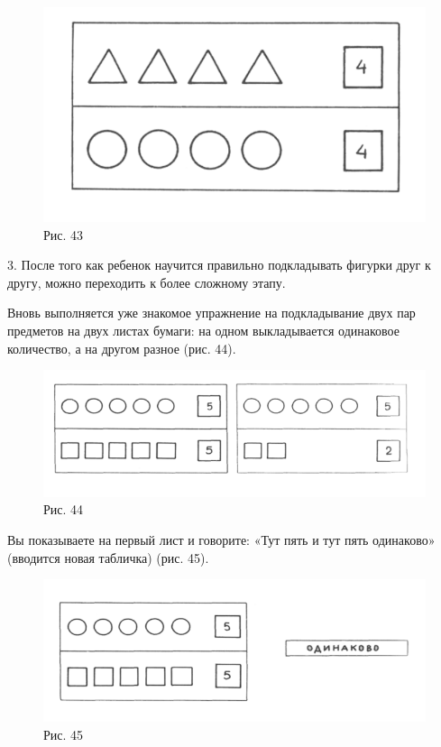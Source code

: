 \documentclass[a5paper]{book}
\begin{document}
\begin{figure}
\centering
\includegraphics[width=\linewidth]{media/media/image39.png}
\caption*{Рис. 43}
\end{figure}

3. После того как ребенок научится правильно подкладывать фигурки друг к
другу, можно переходить к более сложному этапу.

Вновь выполняется уже знакомое упражнение на подкладывание двух пар
предметов на двух листах бумаги: на одном выкладывается одинаковое
количество, а на другом разное (рис. 44).

\begin{figure}
\centering
\includegraphics[width=\linewidth]{media/media/image40.png}
\caption*{Рис. 44}
\end{figure}

Вы показываете на первый лист и говорите: «Тут пять и тут пять
одинаково» (вводится новая табличка) (рис. 45).

\begin{figure}
\centering
\includegraphics[width=\linewidth]{media/media/image41.png}
\caption*{Рис. 45}
\end{figure}
\end{document}
